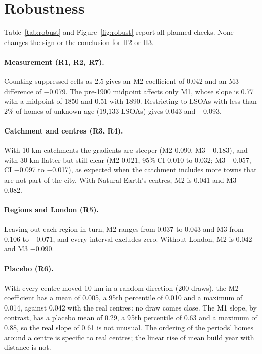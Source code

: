 \documentclass[11pt,a4paper]{article}
\begin{document}
\section{Robustness}
\label{sec:robust}
Table~\ref{tab:robust} and Figure~\ref{fig:robust} report all planned checks. None changes the sign or the conclusion for H2 or H3.

\paragraph{Measurement (R1, R2, R7).} Counting suppressed cells as 2.5 gives an M2 coefficient of 0.042 and an M3 difference of $-$0.079. The pre-1900 midpoint affects only M1, whose slope is 0.77 with a midpoint of 1850 and 0.51 with 1890. Restricting to LSOAs with less than 2\% of homes of unknown age (19,133 LSOAs) gives 0.043 and $-$0.093.

\paragraph{Catchment and centres (R3, R4).} With 10 km catchments the gradients are steeper (M2 0.090, M3 $-$0.183), and with 30 km flatter but still clear (M2 0.021, 95\% CI 0.010 to 0.032; M3 $-$0.057, CI $-$0.097 to $-$0.017), as expected when the catchment includes more towns that are not part of the city. With Natural Earth's centres, M2 is 0.041 and M3 $-$0.082.

\paragraph{Regions and London (R5).} Leaving out each region in turn, M2 ranges from 0.037 to 0.043 and M3 from $-$0.106 to $-$0.071, and every interval excludes zero. Without London, M2 is 0.042 and M3 $-$0.090.

\paragraph{Placebo (R6).} With every centre moved 10 km in a random direction (200 draws), the M2 coefficient has a mean of 0.005, a 95th percentile of 0.010 and a maximum of 0.014, against 0.042 with the real centres: no draw comes close. The M1 slope, by contrast, has a placebo mean of 0.29, a 95th percentile of 0.63 and a maximum of 0.88, so the real slope of 0.61 is not unusual. The ordering of the periods' homes around a centre is specific to real centres; the linear rise of mean build year with distance is not.
\end{document}
